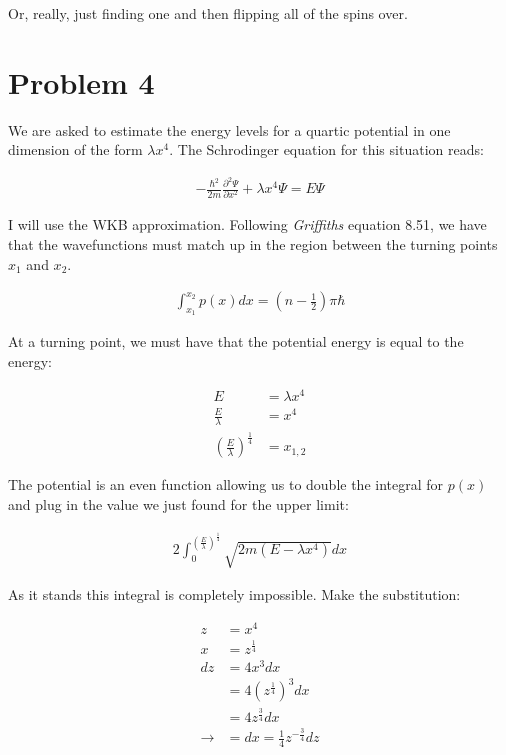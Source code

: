 \documentclass[paper=a4, fontsize=11pt]{scrartcl} %
\numberwithin{equation}{section} %
\numberwithin{figure}{section} %
\numberwithin{table}{section} %
\begin{document}
Or, really, just finding one and then flipping all of the spins over. 

\section{Problem 4}

We are asked to estimate the energy levels for a quartic potential in one dimension of the form $\lambda x^4$. The Schrodinger equation for this situation reads:

\begin{align}
-\frac{\hbar^2}{2m}\frac{\partial^2 \Psi}{\partial x^2} + \lambda x^4 \Psi = E \Psi
\end{align}

I will use the WKB approximation. Following \textit{Griffiths} equation 8.51, we have that the wavefunctions must match up in the region between the turning points $x_1$ and $x_2$.

\begin{align}
\int_{x_1}^{x_2} p(x) dx = \left(n - \frac{1}{2}\right)\pi \hbar
\end{align}

At a turning point, we must have that the potential energy is equal to the energy:

\begin{align}
E &= \lambda x^4 \\
\frac{E}{\lambda} &= x^4 \\
\left(\frac{E}{\lambda}\right)^{\frac{1}{4}} &= x_{1,2}
\end{align}

The potential is an even function allowing us to double the integral for $p(x)$ and plug in the value we just found for the upper limit:

\begin{align}
2 \int_0^{\left(\frac{E}{\lambda}\right)^{\frac{1}{4}}} \sqrt{2m(E - \lambda x^4)} dx
\end{align}

As it stands this integral is completely impossible. Make the substitution:

\begin{align}
z &= x^4 \\
x &= z^{\frac{1}{4}} \\
dz &= 4x^3 dx \\
&= 4 (z^{\frac{1}{4}})^3 dx \\
&= 4 z^{\frac{3}{4}} dx \\
\rightarrow &= dx = \frac{1}{4}z^{-\frac{3}{4}} dz
\end{align}
\end{document}
